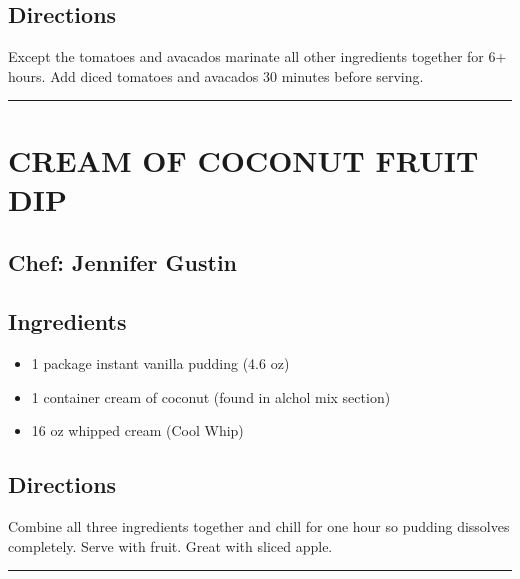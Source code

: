 \documentclass[
]{book}
\providecommand{\tightlist}{%
  \setlength{\itemsep}{0pt}\setlength{\parskip}{0pt}}
\begin{document}
\hypertarget{directions-1}{%
\subsection*{Directions}\label{directions-1}}


Except the tomatoes and avacados marinate all other ingredients together for 6+ hours. Add diced tomatoes and avacados 30 minutes before serving.

\begin{center}\rule{0.5\linewidth}{0.5pt}\end{center}

\hypertarget{cream-of-coconut-fruit-dip}{%
\section*{CREAM OF COCONUT FRUIT DIP}\label{cream-of-coconut-fruit-dip}}


\hypertarget{chef-jennifer-gustin}{%
\subsection*{Chef: Jennifer Gustin}\label{chef-jennifer-gustin}}


\hypertarget{ingredients-2}{%
\subsection*{Ingredients}\label{ingredients-2}}


\begin{itemize}
\tightlist
\item
  1 package instant vanilla pudding (4.6 oz)
\item
  1 container cream of coconut (found in alchol mix section)
\item
  16 oz whipped cream (Cool Whip)
\end{itemize}

\hypertarget{directions-2}{%
\subsection*{Directions}\label{directions-2}}


Combine all three ingredients together and chill for one hour so pudding dissolves completely.
Serve with fruit. Great with sliced apple.

\begin{center}\rule{0.5\linewidth}{0.5pt}\end{center}
\end{document}

